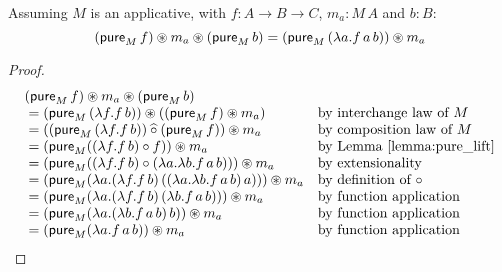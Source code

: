 \begin{lemma}\label{lemma:applicative_flip}
Assuming $M$ is an applicative, with $f : A \rightarrow B \rightarrow C$, $m_a : M\, A$ and $b : B$:
$$
(\mathsf{pure}_M\, f) \circledast m_a \circledast (\mathsf{pure}_M\, b) = (\mathsf{pure}_M\, (\lambda a . f\, a\, b)) \circledast m_a
$$
\end{lemma}
\begin{proof}
$$
\begin{array}{ll}
(\mathsf{pure}_M\, f) \circledast m_a \circledast (\mathsf{pure}_M\, b) \\
{} =  (\mathsf{pure}_M\, (\lambda f. f\, b)) \circledast ((\mathsf{pure}_M\, f) \circledast m_a)
 & \mbox{by interchange law of }M\\
{} =  ((\mathsf{pure}_M\, (\lambda f. f\, b)) \mathbin{\widehat{\circ}} (\mathsf{pure}_M\, f)) \circledast m_a
 & \mbox{by composition law of }M\\
{} =  (\mathsf{pure}_M ( (\lambda f. f\, b) \circ f ) ) \circledast m_a
 & \mbox{by Lemma \ref{lemma:pure_lift}}\\
 {} =  (\mathsf{pure}_M ( (\lambda f. f\, b) \circ (\lambda a . \lambda b . f\, a\, b) )) \circledast m_a
 & \mbox{by extensionality}\\
{} =  (\mathsf{pure}_M (\lambda a. (\lambda f. f\, b)\, ((\lambda a . \lambda b . f\, a\, b)\, a) )) \circledast m_a
 & \mbox{by definition of }\circ\\
{} =  (\mathsf{pure}_M (\lambda a. (\lambda f. f\, b)\, (\lambda b . f\, a\, b) )) \circledast m_a
 & \mbox{by function application}\\
{} =  (\mathsf{pure}_M (\lambda a. (\lambda b . f\, a\, b) \, b )) \circledast m_a
 & \mbox{by function application}\\
{} =  (\mathsf{pure}_M (\lambda a. f\, a\, b )) \circledast m_a
 & \mbox{by function application}\\
\end{array}
$$
\end{proof}

